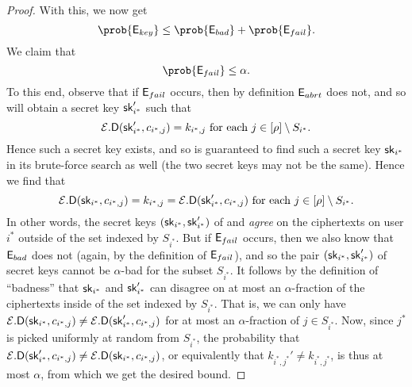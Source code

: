 \begin{proof}
  With this, we now get
  \[
    \prob{\eventE_{key}} \le \prob{\eventE_{bad}} + \prob{\eventE_{fail}}.
  \]
  We claim that
  \[
    \prob{\eventE_{fail}} \le \alpha.
  \]
  To this end, observe that if \(\mathsf{E}_{fail}\) occurs,
  then by definition \(\mathsf{E}_{abrt}\) does not, and so
  \redM will obtain a secret key \(\mathsf{sk}_{i^{*}}'\) such that
  \[
  \mathcal{E}.\mathsf{D}(\mathsf{sk}_{i^{*}}',c_{i^{*},j}) = k_{i^{*},j} \text{ for each } j \in [\rho] \setminus S_{i^{*}}.
  \]
  Hence such a secret key exists, and so \advA is guaranteed to find such a secret key \(\mathsf{sk}_{i^{*}}\)
  in its brute-force search as well (the two secret keys may not be the same).
  Hence we find that
  \[
  \mathcal{E}.\mathsf{D}(\mathsf{sk}_{i^{*}},c_{i^{*},j}) = k_{i^{*},j} = \mathcal{E}.\mathsf{D}(\mathsf{sk}_{i^{*}}',c_{i^{*},j}) \text{ for each } j \in [\rho] \setminus S_{i^{*}}.
  \]
  In other words, the secret keys \((\mathsf{sk}_{i^{*}},\mathsf{sk}_{i^{*}}')\)
  of \advA and \redM \emph{agree} on the ciphertexts on user \(i^{*}\) outside of the set indexed by \(S_{i^{*}}\).
  But if \(\mathsf{E}_{fail}\) occurs, then we also know that \(\mathsf{E}_{bad}\) does not
  (again, by the definition of \(\mathsf{E}_{fail}\)),
  and so the pair \((\mathsf{sk}_{i^{*}},\mathsf{sk}_{i^{*}}')\) of secret keys cannot be
  \(\alpha\)-bad for the subset \(S_{i^{*}}\).
  It follows by the definition of ``badness'' that \(\mathsf{sk}_{i^{*}}\) and \(\mathsf{sk}_{i^{*}}'\)
  can disagree on at most an \(\alpha\)-fraction of the ciphertexts inside of the set indexed by \(S_{i^{*}}\).
  That is, we can only have
  \(\mathcal{E}.\mathsf{D}(\mathsf{sk}_{i^{*}},c_{i^{*},j}) \ne \mathcal{E}.\mathsf{D}(\mathsf{sk}_{i^{*}}',c_{i^{*},j})\)
  for at most an \(\alpha\)-fraction of \(j \in S_{i^{*}}\).
  Now, since \(j^{*}\) is picked uniformly at random from \(S_{i^{*}}\),
  the probability that
  \(\mathcal{E}.\mathsf{D}(\mathsf{sk}_{i^{*}}',c_{i^{*},j}) \ne \mathcal{E}.\mathsf{D}(\mathsf{sk}_{i^{*}},c_{i^{*},j})\),
  or equivalently that \(k_{i^{*},j^{*}}' \ne k_{i^{*},j^{*}}\),
  is thus at most \(\alpha\),
  from which we get the desired bound.


\end{proof}
